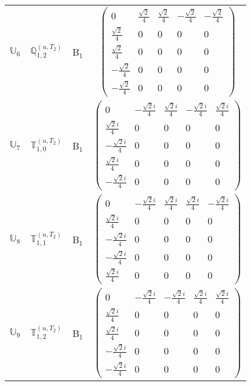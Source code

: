 \documentclass[fleqn,10pt,landscape]{article}
\begin{document}
\begin{itemize}
\begin{center}
\begin{longtable}{c|c|c|c}
$ \mathbb{U}_{6} $ & $\mathbb{Q}_{1,2}^{(u,T_{2})}$ & B$_{1}$ & $\begin{pmatrix} 0 & \frac{\sqrt{2}}{4} & \frac{\sqrt{2}}{4} & - \frac{\sqrt{2}}{4} & - \frac{\sqrt{2}}{4} \\ \frac{\sqrt{2}}{4} & 0 & 0 & 0 & 0 \\ \frac{\sqrt{2}}{4} & 0 & 0 & 0 & 0 \\ - \frac{\sqrt{2}}{4} & 0 & 0 & 0 & 0 \\ - \frac{\sqrt{2}}{4} & 0 & 0 & 0 & 0 \end{pmatrix}$ \\
$ \mathbb{U}_{7} $ & $\mathbb{T}_{1,0}^{(u,T_{2})}$ & B$_{1}$ & $\begin{pmatrix} 0 & - \frac{\sqrt{2} i}{4} & \frac{\sqrt{2} i}{4} & - \frac{\sqrt{2} i}{4} & \frac{\sqrt{2} i}{4} \\ \frac{\sqrt{2} i}{4} & 0 & 0 & 0 & 0 \\ - \frac{\sqrt{2} i}{4} & 0 & 0 & 0 & 0 \\ \frac{\sqrt{2} i}{4} & 0 & 0 & 0 & 0 \\ - \frac{\sqrt{2} i}{4} & 0 & 0 & 0 & 0 \end{pmatrix}$ \\
$ \mathbb{U}_{8} $ & $\mathbb{T}_{1,1}^{(u,T_{2})}$ & B$_{1}$ & $\begin{pmatrix} 0 & - \frac{\sqrt{2} i}{4} & \frac{\sqrt{2} i}{4} & \frac{\sqrt{2} i}{4} & - \frac{\sqrt{2} i}{4} \\ \frac{\sqrt{2} i}{4} & 0 & 0 & 0 & 0 \\ - \frac{\sqrt{2} i}{4} & 0 & 0 & 0 & 0 \\ - \frac{\sqrt{2} i}{4} & 0 & 0 & 0 & 0 \\ \frac{\sqrt{2} i}{4} & 0 & 0 & 0 & 0 \end{pmatrix}$ \\
$ \mathbb{U}_{9} $ & $\mathbb{T}_{1,2}^{(u,T_{2})}$ & B$_{1}$ & $\begin{pmatrix} 0 & - \frac{\sqrt{2} i}{4} & - \frac{\sqrt{2} i}{4} & \frac{\sqrt{2} i}{4} & \frac{\sqrt{2} i}{4} \\ \frac{\sqrt{2} i}{4} & 0 & 0 & 0 & 0 \\ \frac{\sqrt{2} i}{4} & 0 & 0 & 0 & 0 \\ - \frac{\sqrt{2} i}{4} & 0 & 0 & 0 & 0 \\ - \frac{\sqrt{2} i}{4} & 0 & 0 & 0 & 0 \end{pmatrix}$ \\
\end{longtable}
\end{center}


\end{itemize}
\end{document}
